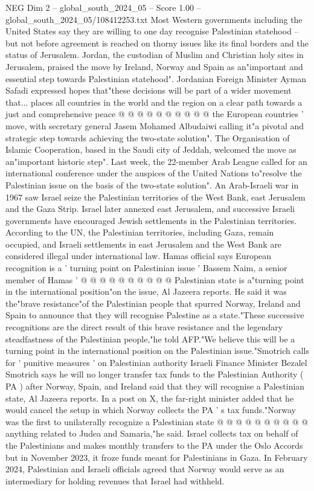 \begin{textsample}{NEG Dim 2 – global\_south\_2024\_05 – Score 1.00 – global\_south\_2024\_05/108412253.txt}
Most Western governments including the United States say they are willing to one day recognise Palestinian statehood -- but not before agreement is reached on thorny issues like its final borders and the status of Jerusalem.
Jordan, the custodian of Muslim and Christian holy sites in Jerusalem, praised the move by Ireland, Norway and Spain as an"important and essential step towards Palestinian statehood".
Jordanian Foreign Minister Ayman Safadi expressed hopes that"these decisions will be part of a wider movement that... places all countries in the world and the region on a clear path towards a just and comprehensive peace @ @ @ @ @ @ @ @ @ @ the European countries ' move, with secretary general Jasem Mohamed Albudaiwi calling it"a pivotal and strategic step towards achieving the two-state solution".
The Organisation of Islamic Cooperation, based in the Saudi city of Jeddah, welcomed the move as an"important historic step".
Last week, the 22-member Arab League called for an international conference under the auspices of the United Nations to"resolve the Palestinian issue on the basis of the two-state solution".
An Arab-Israeli war in 1967 saw Israel seize the Palestinian territories of the West Bank, east Jerusalem and the Gaza Strip.
Israel later annexed east Jerusalem, and successive Israeli governments have encouraged Jewish settlements in the Palestinian territories.
According to the UN, the Palestinian territories, including Gaza, remain occupied, and Israeli settlements in east Jerusalem and the West Bank are considered illegal under international law.
Hamas official says European recognition is a ' turning point on Palestinian issue ' Bassem Naim, a senior member of Hamas ' @ @ @ @ @ @ @ @ @ @ Palestinian state is a"turning point in the international position"on the issue, Al Jazeera reports.
He said it was the"brave resistance"of the Palestinian people that spurred Norway, Ireland and Spain to announce that they will recognise Palestine as a state."These successive recognitions are the direct result of this brave resistance and the legendary steadfastness of the Palestinian people,"he told AFP."We believe this will be a turning point in the international position on the Palestinian issue."Smotrich calls for ' punitive measures ' on Palestinian authority Israeli Finance Minister Bezalel Smotrich says he will no longer transfer tax funds to the Palestinian Authority ( PA ) after Norway, Spain, and Ireland said that they will recognise a Palestinian state, Al Jazeera reports.
In a post on X, the far-right minister added that he would cancel the setup in which Norway collects the PA ' s tax funds."Norway was the first to unilaterally recognize a Palestinian state @ @ @ @ @ @ @ @ @ @ anything related to Judea and Samaria,"he said.
Israel collects tax on behalf of the Palestinians and makes monthly transfers to the PA under the Oslo Accords but in November 2023, it froze funds meant for Palestinians in Gaza.
In February 2024, Palestinian and Israeli officials agreed that Norway would serve as an intermediary for holding revenues that Israel had withheld.

\end{textsample}
